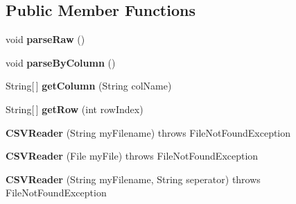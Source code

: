 \subsection*{Public Member Functions}
\begin{DoxyCompactItemize}
\item 
\hypertarget{classuk_1_1ac_1_1dmu_1_1iesd_1_1cascade_1_1io_1_1_c_s_v_reader_a4d7ef5001f55119fdc1f1b170bf207cd}{void {\bfseries parse\-Raw} ()}\label{classuk_1_1ac_1_1dmu_1_1iesd_1_1cascade_1_1io_1_1_c_s_v_reader_a4d7ef5001f55119fdc1f1b170bf207cd}

\item 
\hypertarget{classuk_1_1ac_1_1dmu_1_1iesd_1_1cascade_1_1io_1_1_c_s_v_reader_ad5e8f10e560a11a5e60be6638b8e746b}{void {\bfseries parse\-By\-Column} ()}\label{classuk_1_1ac_1_1dmu_1_1iesd_1_1cascade_1_1io_1_1_c_s_v_reader_ad5e8f10e560a11a5e60be6638b8e746b}

\item 
\hypertarget{classuk_1_1ac_1_1dmu_1_1iesd_1_1cascade_1_1io_1_1_c_s_v_reader_a6f50ba6815bb2613902889241807cb93}{String\mbox{[}$\,$\mbox{]} {\bfseries get\-Column} (String col\-Name)}\label{classuk_1_1ac_1_1dmu_1_1iesd_1_1cascade_1_1io_1_1_c_s_v_reader_a6f50ba6815bb2613902889241807cb93}

\item 
\hypertarget{classuk_1_1ac_1_1dmu_1_1iesd_1_1cascade_1_1io_1_1_c_s_v_reader_ae92188f67b5f829411c321894966e263}{String\mbox{[}$\,$\mbox{]} {\bfseries get\-Row} (int row\-Index)}\label{classuk_1_1ac_1_1dmu_1_1iesd_1_1cascade_1_1io_1_1_c_s_v_reader_ae92188f67b5f829411c321894966e263}

\item 
\hypertarget{classuk_1_1ac_1_1dmu_1_1iesd_1_1cascade_1_1io_1_1_c_s_v_reader_a4f2544d618ca1e69b2aaa55f6ebbde60}{{\bfseries C\-S\-V\-Reader} (String my\-Filename)  throws File\-Not\-Found\-Exception 	}\label{classuk_1_1ac_1_1dmu_1_1iesd_1_1cascade_1_1io_1_1_c_s_v_reader_a4f2544d618ca1e69b2aaa55f6ebbde60}

\item 
\hypertarget{classuk_1_1ac_1_1dmu_1_1iesd_1_1cascade_1_1io_1_1_c_s_v_reader_a190589f81a56d9c295cc7fecef31d2ca}{{\bfseries C\-S\-V\-Reader} (File my\-File)  throws File\-Not\-Found\-Exception 	}\label{classuk_1_1ac_1_1dmu_1_1iesd_1_1cascade_1_1io_1_1_c_s_v_reader_a190589f81a56d9c295cc7fecef31d2ca}

\item 
\hypertarget{classuk_1_1ac_1_1dmu_1_1iesd_1_1cascade_1_1io_1_1_c_s_v_reader_ae2d3749ddfadf80402f911c3171bd106}{{\bfseries C\-S\-V\-Reader} (String my\-Filename, String seperator)  throws File\-Not\-Found\-Exception 	}\label{classuk_1_1ac_1_1dmu_1_1iesd_1_1cascade_1_1io_1_1_c_s_v_reader_ae2d3749ddfadf80402f911c3171bd106}


\end{DoxyCompactItemize}
